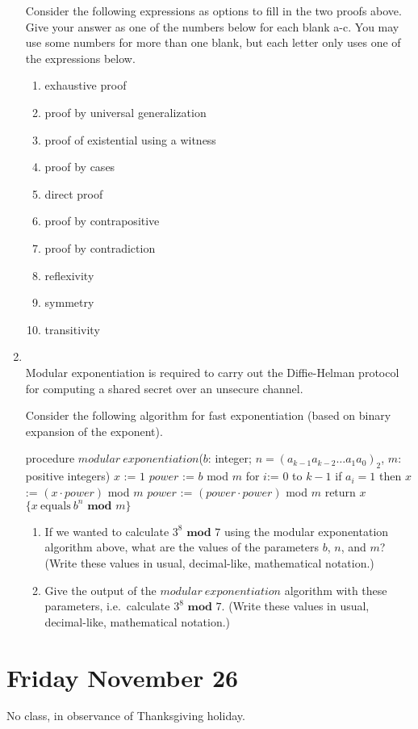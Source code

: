 \documentclass[12pt, oneside]{article}
\begin{document}
\begin{enumerate}
Consider the following expressions as options to fill in the two proofs above. Give your answer as one of the numbers below for each blank a-c. You may use some numbers for more than one blank, but each letter only uses one of the expressions below.

\begin{multicols}{2}
\begin{enumerate}[label=\roman*]
\item exhaustive proof
\item proof by universal generalization
\item proof of existential using a witness
\item proof by cases
\item direct proof
\item proof by contrapositive
\item proof by contradiction
\item reflexivity
\item symmetry
\item transitivity
\end{enumerate}
\end{multicols}     \item \hspace{1in}\\ 

Modular exponentiation is required to carry out the Diffie-Helman protocol for 
computing a shared secret over an unsecure channel.

Consider the following algorithm for fast exponentiation (based on binary 
expansion of the exponent).

  

\begin{algorithm}[caption={Modular Exponentation}]
    procedure $modular~exponentiation$($b$: integer; 
                 $n = (a_{k-1}a_{k-2} \ldots a_1 a_0)_2$, $m$: positive integers)
    $x$ := $1$
    $power$ := $b$ mod $m$
    for $i$:= $0$ to $k-1$
      if $a_i = 1$ then $x$:= $(x \cdot power)$ mod $m$
      $power$ := $(power \cdot power)$ mod $m$
    return $x$ $\{x~\textrm{equals}~b^n \textbf{ mod } m\} $
\end{algorithm}     
    \begin{enumerate}
        \item If we wanted to calculate $3^8 \textbf{ mod } 7$ 
        using the modular exponentation algorithm above, what are the values of 
        the parameters $b$, $n$, and $m$?  (Write these values in usual, 
        decimal-like, mathematical notation.)
        \item Give the output of the $modular~exponentiation$ algorithm 
        with these parameters, i.e.\ calculate $3^8 \textbf{ mod } 7$.
        (Write these values in usual, 
        decimal-like, mathematical notation.)
    \end{enumerate} \end{enumerate}

\newpage
\section*{Friday November 26}

No class, in observance of Thanksgiving holiday.
\end{document}

